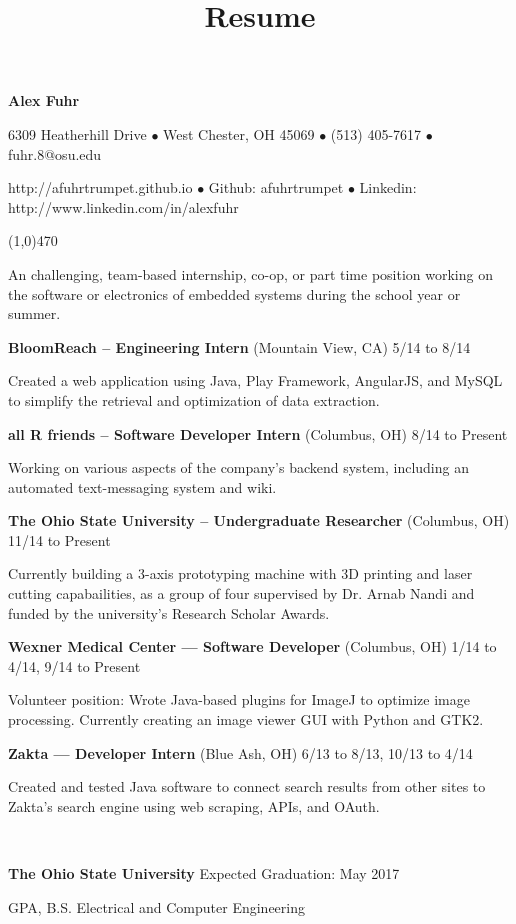 \documentclass[10pt]{article}
\title{Resume}
\begin{document}
\centerline{{\LARGE \bf Alex Fuhr}}
\centerline{6309 Heatherhill Drive $\bullet$ West Chester, OH 45069 $\bullet$ (513) 405-7617 $\bullet$ fuhr.8@osu.edu}
\centerline{http://afuhrtrumpet.github.io $\bullet$ Github: afuhrtrumpet $\bullet$ Linkedin: http://www.linkedin.com/in/alexfuhr}
\noindent
\line(1,0){470}\\

\smallskip

\noindent
An challenging, team-based internship, co-op, or part time position working on the software or electronics of embedded systems during the school year or summer.
\medskip



\smallskip

\centerline{{\large {\bf BloomReach -- Engineering Intern} (Mountain View, CA) \hfill 5/14 to 8/14}}
\noindent
Created a web application using Java, Play Framework, AngularJS, and MySQL to simplify the retrieval and optimization of data extraction.

\smallskip
\centerline{{\large {\bf all R friends -- Software Developer Intern} (Columbus, OH) \hfill 8/14 to Present}}
\noindent
Working on various aspects of the company's backend system, including an automated text-messaging system and wiki.
\smallskip

\centerline{{\large {\bf The Ohio State University -- Undergraduate Researcher} (Columbus, OH) \hfill 11/14 to Present}}
\noindent
Currently building a 3-axis prototyping machine with 3D printing and laser cutting capabailities, as a group of four supervised by Dr. Arnab Nandi and funded by the university's Research Scholar Awards.
\smallskip

\centerline{{\large {\bf Wexner Medical Center --- Software Developer} (Columbus, OH) \hfill 1/14 to 4/14, 9/14 to Present}}
\noindent
Volunteer position: Wrote Java-based plugins for ImageJ to optimize image processing. Currently creating an image viewer GUI with Python and GTK2.
\smallskip

\centerline{{\large {\bf Zakta --- Developer Intern} (Blue Ash, OH) \hfill 6/13 to 8/13, 10/13 to 4/14}}
\noindent
Created and tested Java software to connect search results from other sites to Zakta's search engine using web scraping, APIs, and OAuth.
\medskip

\\
\smallskip
\centerline{{\large {\bf The Ohio State University} \hfill Expected Graduation: May 2017}}
 GPA, B.S. Electrical and Computer Engineering
\medskip
\end{document}
